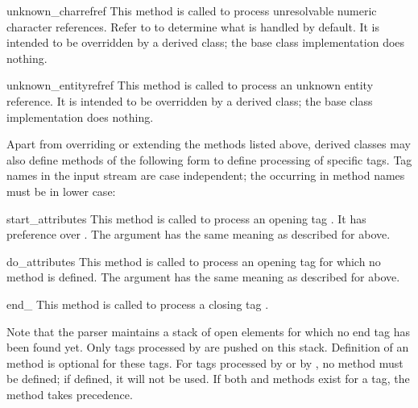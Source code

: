 \begin{methoddesc}{unknown_charref}{ref}
This method is called to process unresolvable numeric character
references.  Refer to  to determine what is
handled by default.  It is intended to be overridden by a derived
class; the base class implementation does nothing.
\end{methoddesc}

\begin{methoddesc}{unknown_entityref}{ref}
This method is called to process an unknown entity reference.  It is
intended to be overridden by a derived class; the base class
implementation does nothing.
\end{methoddesc}

Apart from overriding or extending the methods listed above, derived
classes may also define methods of the following form to define
processing of specific tags.  Tag names in the input stream are case
independent; the  occurring in method names must be in lower
case:

\begin{methoddescni}{start_}{attributes}
This method is called to process an opening tag .  It has
preference over .  The
 argument has the same meaning as described for
 above.
\end{methoddescni}

\begin{methoddescni}{do_}{attributes}
This method is called to process an opening tag  
for which no  method is defined.  
The  argument
has the same meaning as described for  above.
\end{methoddescni}

\begin{methoddescni}{end_}{}
This method is called to process a closing tag .
\end{methoddescni}

Note that the parser maintains a stack of open elements for which no
end tag has been found yet.  Only tags processed by
 are pushed on this stack.  Definition of an
 method is optional for these tags.  For tags
processed by  or by , no
 method must be defined; if defined, it will
not be used.  If both  and
 methods exist for a tag, the
 method takes precedence.
